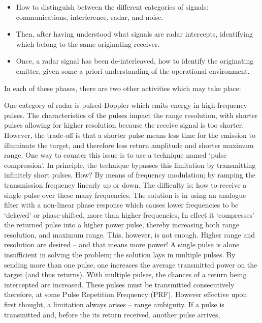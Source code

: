 \begin{itemize}
    \item How to distinguish between the different categories of signals: communications, interference, radar, and noise.
    \item Then, after having understood what signals are radar intercepts, identifying which belong to the same originating receiver. 
    \item Once, a radar signal has been de-interleaved, how to identify the originating emitter, given some a priori understanding of the operational environment.
\end{itemize}

In each of these phases, there are two other activities which may take place:


One category of radar is pulsed-Doppler which emits energy in high-frequency pulses. The characteristics of the pulses impact the range resolution, with shorter pulses allowing for higher resolution because the receive signal is too shorter. However, the trade-off is that a shorter pulse means less time for the emission to illuminate the target, and therefore less return amplitude and shorter maximum range. One way to counter this issue is to use a technique named ‘pulse compression’. In principle, the technique bypasses this limitation by transmitting infinitely short pulses. How? By means of frequency modulation; by ramping the transmission frequency linearly up or down. The difficulty is: how to receive a single pulse over these many frequencies. The solution is in using an analogue filter with a non-linear phase response which causes lower frequencies to be ‘delayed’ or phase-shifted, more than higher frequencies, In effect it ‘compresses’ the returned pulse into a higher power pulse, thereby increasing both range resolution, and maximum range. This, however, is not enough. Higher range and resolution are desired – and that means more power! A single pulse is alone insufficient in solving the problem; the solution lays in multiple pulses. By sending more than one pulse, one increases the average transmitted power on the target (and thus returns). With multiple pulses, the chances of a return being intercepted are increased. These pulses must be transmitted consecutively therefore, at some Pulse Repetition Frequency (PRF). However effective upon first thought, a limitation always arises – range ambiguity. If a pulse is transmitted and, before the its return received, another pulse arrives,  \cite{parker_chapter_2010}



